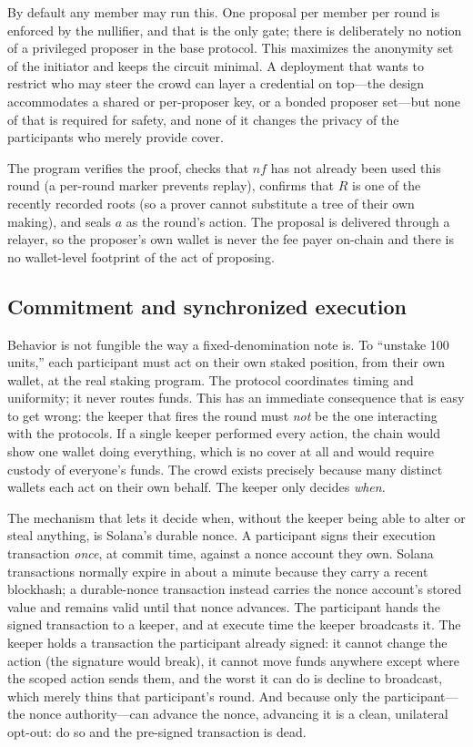 \documentclass[11pt]{article}
\begin{document}
By default any member may run this. One proposal per member per round is enforced
by the nullifier, and that is the only gate; there is deliberately no notion of a
privileged proposer in the base protocol. This maximizes the anonymity set of the
initiator and keeps the circuit minimal. A deployment that wants to restrict who
may steer the crowd can layer a credential on top---the design accommodates a
shared or per-proposer key, or a bonded proposer set---but none of that is
required for safety, and none of it changes the privacy of the participants who
merely provide cover.

The program verifies the proof, checks that $\mathit{nf}$ has not already been
used this round (a per-round marker prevents replay), confirms that $R$ is one of
the recently recorded roots (so a prover cannot substitute a tree of their own
making), and seals $a$ as the round's action. The proposal is delivered through a
relayer, so the proposer's own wallet is never the fee payer on-chain and there
is no wallet-level footprint of the act of proposing.

\subsection{Commitment and synchronized execution}
\label{sec:execute}

Behavior is not fungible the way a fixed-denomination note is. To ``unstake 100
units,'' each participant must act on their own staked position, from their own
wallet, at the real staking program. The protocol coordinates timing and
uniformity; it never routes funds. This has an immediate consequence that is easy
to get wrong: the keeper that fires the round must \emph{not} be the one
interacting with the protocols. If a single keeper performed every action, the
chain would show one wallet doing everything, which is no cover at all and would
require custody of everyone's funds. The crowd exists precisely because many
distinct wallets each act on their own behalf. The keeper only decides
\emph{when}.

The mechanism that lets it decide when, without the keeper being able to alter or
steal anything, is Solana's durable nonce. A participant signs their execution
transaction \emph{once}, at commit time, against a nonce account they own. Solana
transactions normally expire in about a minute because they carry a recent
blockhash; a durable-nonce transaction instead carries the nonce account's stored
value and remains valid until that nonce advances. The participant hands the
signed transaction to a keeper, and at execute time the keeper broadcasts it. The
keeper holds a transaction the participant already signed: it cannot change the
action (the signature would break), it cannot move funds anywhere except where the
scoped action sends them, and the worst it can do is decline to broadcast, which
merely thins that participant's round. And because only the participant---the
nonce authority---can advance the nonce, advancing it is a clean, unilateral
opt-out: do so and the pre-signed transaction is dead.
\end{document}
